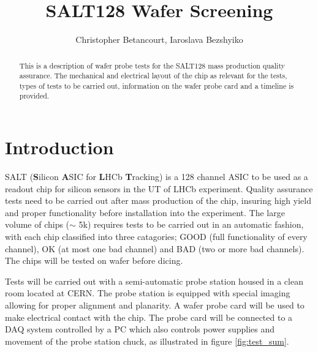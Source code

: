 \documentclass{lhcbnote}
\title{SALT128 Wafer Screening}
\author{Christopher Betancourt, Iaroslava Bezshyiko {\address{University of Zurich, Switzerland}}
}
\begin{document}
\maketitle

\begin{abstract}
This is a description of wafer probe tests for the SALT128 mass production quality assurance. The mechanical and electrical layout of the chip as relevant for the tests, types of tests to be carried out, information on the wafer probe card and a timeline is provided.
\end{abstract}


\tableofcontents

\listoffigures
\listoftables

\section{Introduction}
SALT (\textbf{S}ilicon \textbf{A}SIC for \textbf{L}HCb \textbf{T}racking) is a 128 channel ASIC to be used as a readout chip for silicon sensors in the UT of LHCb experiment. Quality assurance tests need to be carried out after mass production of the chip, insuring high yield and proper functionality before installation into the experiment. The large volume of chips ($\sim$ 5k) requires tests to be carried out in an automatic fashion, with each chip classified into three catagories; GOOD (full functionality of every channel), OK (at most one bad channel) and BAD (two or more bad channels). The chips will be tested on wafer before dicing.

Tests will be carried out with a semi-automatic probe station housed in a clean room located at CERN. The probe station is equipped with special imaging allowing for proper alignment and planarity. A wafer probe card will be used to make electrical contact with the chip. The probe card will be connected to a DAQ system controlled by a PC which also controls power supplies and movement of the probe station chuck, as illustrated in figure \ref{fig:test_sum}.
\end{document}
